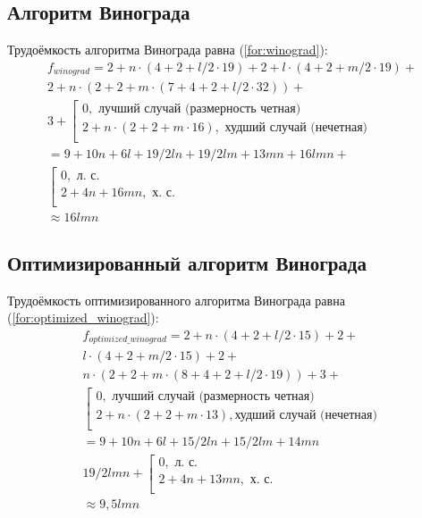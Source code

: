 \subsection{Алгоритм Винограда}

Трудоёмкость алгоритма Винограда равна (\ref{for:winograd}):
\begin{equation}
	\label{for:winograd}
	\begin{array}{c}
	f_{winograd} = 2 + n \cdot (4 + 2 + l/2 \cdot 19) + 2 + l \cdot (4 + 2 + m/2 \cdot 19) +\\ 2 + n \cdot (2 + 2 + m \cdot (7 + 4 + 2 + l/2 \cdot 32)) + \\ 3 + \left[
	\begin{array}{c}
	0, \text{ лучший случай (размерность четная)}\\
	2 + n \cdot (2 + 2 + m \cdot 16), \text{ худший случай (нечетная)}\\
	\end{array}\right.\\
	= 9 + 10n + 6l + 19/2ln + 19/2lm + 13mn + 16lmn + \\ \left[
	\begin{array}{c}
		0, \text{ л. с.}\\
		2 + 4n + 16mn, \text{ х. с.}\\
	\end{array}\right.\\ \approx 16lmn
	\end{array}
\end{equation}

\subsection{Оптимизированный алгоритм Винограда}

Трудоёмкость оптимизированного алгоритма Винограда равна (\ref{for:optimized_winograd}):
\begin{equation}
	\label{for:optimized_winograd}
	\begin{array}{c}
		f_{optimized\_winograd} = 2 + n \cdot (4 + 2 + l/2 \cdot 15) + 2 + \\l \cdot (4 + 2 + m/2 \cdot 15) + 2 + \\n \cdot (2 + 2 + m \cdot (8 + 4 + 2 + l/2 \cdot 19)) + 3 + \\\left[
		\begin{array}{c}
			0, \text{ лучший случай (размерность четная)}\\
			2 + n \cdot (2 + 2 + m \cdot 13), \text{худший случай (нечетная)}\\
		\end{array}\right.\\
		= 9 + 10n + 6l + 15/2ln + 15/2lm + 14mn \\ 19/2lmn + \left[
		\begin{array}{c}
			0, \text{ л. с.}\\
			2 + 4n + 13mn, \text{ х. с.}\\
		\end{array}\right.\\ \approx 9,5lmn
	\end{array}
\end{equation}

